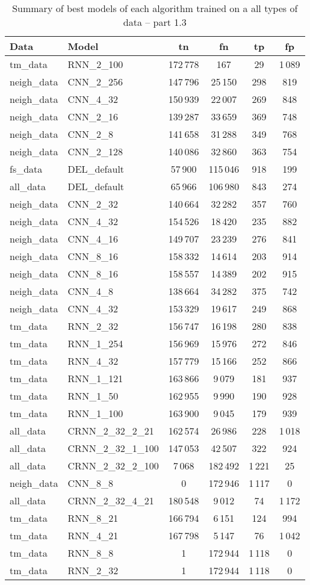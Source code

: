 \documentclass[thesis=M,english]{FITthesis}[2012/10/20]
\begin{document}
\begin{table}[H]\centering
\begin{small}
    \caption{Summary of best models of each algorithm trained on a all types of data -- part 1.3}\label{tab:all_data_summary_1_3}
    \begin{tabular}{|l|l|c|c|c|c|}\hline
Data & Model & \gls{tn} & \gls{fn} & \gls{tp} & \gls{fp} \tabularnewline \hline \hline
tm\_data & RNN\_2\_100 & 172\,778 & 167 & 29 & 1\,089 \tabularnewline  \hline 
neigh\_data & CNN\_2\_256 & 147\,796 & 25\,150 & 298 & 819 \tabularnewline  \hline 
neigh\_data & CNN\_4\_32 & 150\,939 & 22\,007 & 269 & 848 \tabularnewline  \hline 
neigh\_data & CNN\_2\_16 & 139\,287 & 33\,659 & 369 & 748 \tabularnewline  \hline 
neigh\_data & CNN\_2\_8 & 141\,658 & 31\,288 & 349 & 768 \tabularnewline  \hline 
neigh\_data & CNN\_2\_128 & 140\,086 & 32\,860 & 363 & 754 \tabularnewline  \hline 
fs\_data & DEL\_default & 57\,900 & 115\,046 & 918 & 199 \tabularnewline  \hline 
all\_data & DEL\_default & 65\,966 & 106\,980 & 843 & 274 \tabularnewline  \hline 
neigh\_data & CNN\_2\_32 & 140\,664 & 32\,282 & 357 & 760 \tabularnewline  \hline 
neigh\_data & CNN\_4\_32 & 154\,526 & 18\,420 & 235 & 882 \tabularnewline  \hline 
neigh\_data & CNN\_4\_16 & 149\,707 & 23\,239 & 276 & 841 \tabularnewline  \hline 
neigh\_data & CNN\_8\_16 & 158\,332 & 14\,614 & 203 & 914 \tabularnewline  \hline 
neigh\_data & CNN\_8\_16 & 158\,557 & 14\,389 & 202 & 915 \tabularnewline  \hline 
neigh\_data & CNN\_4\_8 & 138\,664 & 34\,282 & 375 & 742 \tabularnewline  \hline 
neigh\_data & CNN\_4\_32 & 153\,329 & 19\,617 & 249 & 868 \tabularnewline  \hline 
tm\_data & RNN\_2\_32 & 156\,747 & 16\,198 & 280 & 838 \tabularnewline  \hline 
tm\_data & RNN\_1\_254 & 156\,969 & 15\,976 & 272 & 846 \tabularnewline  \hline 
tm\_data & RNN\_4\_32 & 157\,779 & 15\,166 & 252 & 866 \tabularnewline  \hline 
tm\_data & RNN\_1\_121 & 163\,866 & 9\,079 & 181 & 937 \tabularnewline  \hline 
tm\_data & RNN\_1\_50 & 162\,955 & 9\,990 & 190 & 928 \tabularnewline  \hline 
tm\_data & RNN\_1\_100 & 163\,900 & 9\,045 & 179 & 939 \tabularnewline  \hline 
all\_data & CRNN\_2\_32\_2\_21 & 162\,574 & 26\,986 & 228 & 1\,018 \tabularnewline  \hline 
all\_data & CRNN\_2\_32\_1\_100 & 147\,053 & 42\,507 & 322 & 924 \tabularnewline  \hline 
all\_data & CRNN\_2\_32\_2\_100 & 7\,068 & 182\,492 & 1\,221 & 25 \tabularnewline  \hline 
neigh\_data & CNN\_8\_8 & 0 & 172\,946 & 1\,117 & 0 \tabularnewline  \hline 
all\_data & CRNN\_2\_32\_4\_21 & 180\,548 & 9\,012 & 74 & 1\,172 \tabularnewline  \hline 
tm\_data & RNN\_8\_21 & 166\,794 & 6\,151 & 124 & 994 \tabularnewline  \hline 
tm\_data & RNN\_4\_21 & 167\,798 & 5\,147 & 76 & 1\,042 \tabularnewline  \hline 
tm\_data & RNN\_8\_8 & 1 & 172\,944 & 1\,118 & 0 \tabularnewline  \hline 
tm\_data & RNN\_2\_32 & 1 & 172\,944 & 1\,118 & 0 \tabularnewline  \hline 
    \end{tabular}
\end{small}
\end{table}
\end{document}
